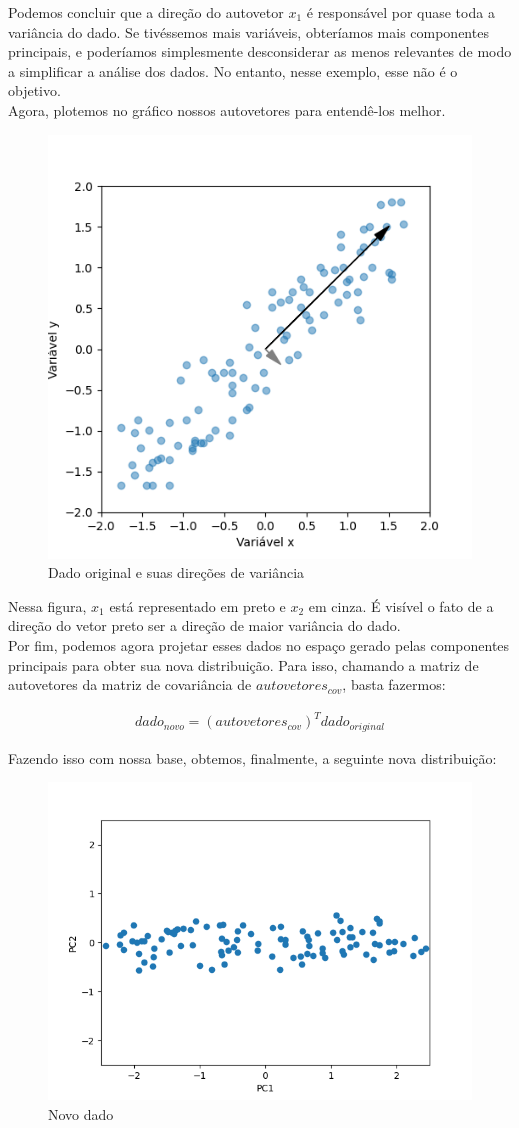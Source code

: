 \documentclass{article}
\begin{document}
Podemos concluir que a direção do autovetor $x_1$ é responsável por quase toda a variância do dado. Se tivéssemos mais variáveis, obteríamos mais componentes principais, e poderíamos simplesmente desconsiderar as menos relevantes de modo a simplificar a análise dos dados. No entanto, nesse exemplo, esse não é o objetivo. \\

Agora, plotemos no gráfico nossos autovetores para entendê-los melhor.

\begin{figure}[h!]
    \centering
    \includegraphics[width=0.4\linewidth]{Figure_4.png}
    \caption{Dado original e suas direções de variância}
    \label{fig:enter-label}
\end{figure}

Nessa figura, $x_1$ está representado em preto e $x_2$ em cinza. É visível o fato de a direção do vetor preto ser a direção de maior variância do dado. \\

Por fim, podemos agora projetar esses dados no espaço gerado pelas componentes principais para obter sua nova distribuição. Para isso, chamando a matriz de autovetores da matriz de covariância de $autovetores_{cov}$, basta fazermos:

\begin{align*}
    dado_{novo} = (autovetores_{cov})^Tdado_{original}
\end{align*}

Fazendo isso com nossa base, obtemos, finalmente, a seguinte nova distribuição:

\begin{figure}[h!]
    \centering
    \includegraphics[width=0.4\linewidth]{Figure_6.png}
    \caption{Novo dado}
    \label{fig:enter-label}
\end{figure}
\end{document}
